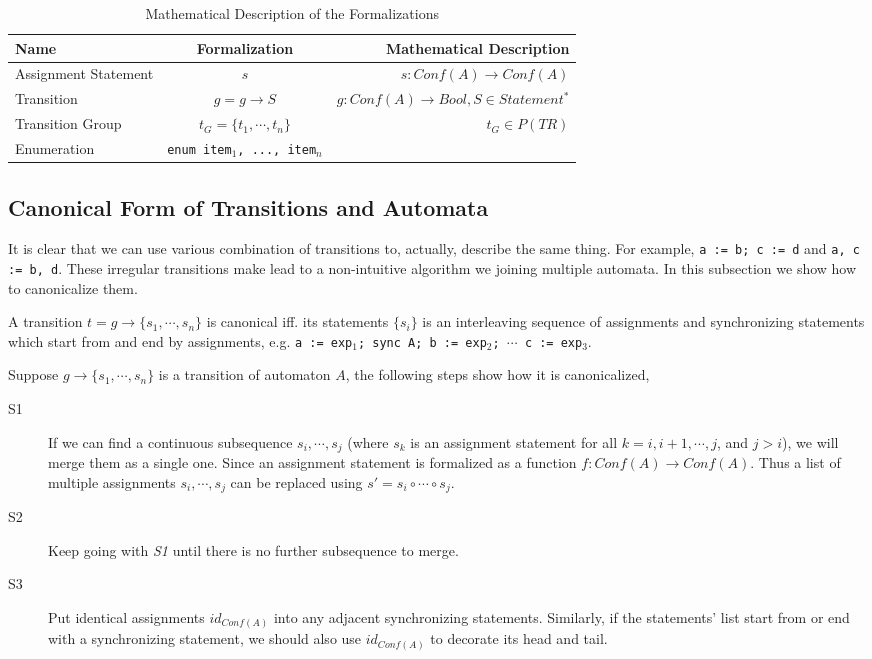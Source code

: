 \begin{table}
    \caption{Mathematical Description of the Formalizations}
    \label{table:mathdesc}
    \centering
    \begin{tabular}{lcr}
        \hline
        Name & Formalization & Mathematical Description \T\B \\
        \hline
        \T Assignment Statement\hspace{0.5cm} & $s$ & $s:Conf(A)\rightarrow Conf(A)$  \\
        Transition & $g=g\rightarrow S$ & $g:Conf(A)\rightarrow Bool,S\in Statement^* $  \\
        Transition Group & $t_G=\{t_1,\cdots,t_n\}$ & $t_G\in P(TR)$ \\
        \B Enumeration & \texttt{enum {item$_1$, ..., item$_n$}} \\
        \hline
    \end{tabular}
\end{table}


\subsection{Canonical Form of Transitions and Automata}
\label{subsec:canonical}

It is clear that we can use various combination of transitions to, actually, describe the same thing. For example, \texttt{a := b; c := d} and \texttt{a, c := b, d}. These irregular transitions make lead to a non-intuitive algorithm we joining multiple automata. In this subsection we show how to canonicalize them.

\begin{definition}
A transition $t=g\rightarrow\{s_1,\cdots,s_n\}$ is canonical iff. its statements $\{s_i\}$ is an interleaving sequence of assignments and synchronizing statements which start from and end by assignments, e.g. \texttt{a := exp$_1$; sync A; b := exp$_2$; $\cdots$ \texttt{c := exp$_3$}}.
\end{definition}

Suppose $g\rightarrow\{s_1,\cdots,s_n\}$ is a transition of automaton $A$, the following steps show how it is canonicalized,
\begin{description}
    \item[S1] If we can find a continuous subsequence $s_i,\cdots,s_j$ (where $s_k$ is an assignment statement for all $k= i,i+1,\cdots,j$, and $j>i$), we will merge them as a single one. Since an assignment statement is formalized as a function $f:Conf(A)\rightarrow Conf(A)$. Thus a list of multiple assignments $s_i,\cdots, s_j$ can be replaced using $s'=s_i\circ\cdots \circ s_j$.
    \item[S2] Keep going with \emph{S1} until there is no further subsequence to merge.
    \item[S3] Put identical assignments $id_{Conf(A)}$ into any adjacent synchronizing statements. Similarly, if the statements' list start from or end with a synchronizing statement, we should also use $id_{Conf(A)}$ to decorate its head and tail.
\end{description}

